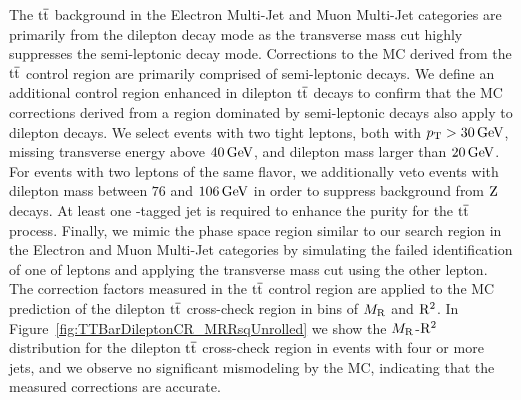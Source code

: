 The $\mathrm{t}\overline{\mathrm{t}}$ background in the Electron Multi-Jet and Muon Multi-Jet categories are primarily from
the dilepton decay mode as the transverse mass cut highly suppresses the semi-leptonic decay
mode. Corrections to the MC derived from the $\mathrm{t}\overline{\mathrm{t}}$ control region are primarily comprised
of semi-leptonic decays. We define an additional control region enhanced in dilepton $\mathrm{t}\overline{\mathrm{t}}$ decays 
to confirm that the MC corrections derived from a region dominated by
semi-leptonic decays also apply to dilepton decays. We select events with two tight leptons, 
both with $p_{\mathrm{T}}>30 \,\text{Ge\hspace{-.08em}V}$, missing transverse energy above $40\,\text{Ge\hspace{-.08em}V}$, and 
dilepton mass larger than $20\,\text{Ge\hspace{-.08em}V}$. For events with two leptons of the same flavor, we additionally
veto events with dilepton mass between $76$ and $106\,\text{Ge\hspace{-.08em}V}$ in order to suppress background from $\mathrm{Z}$ 
decays. At least one \PQb-tagged jet is required to enhance the purity for the $\mathrm{t}\overline{\mathrm{t}}$
process. Finally, we mimic the phase space region similar to our search region in the Electron and
Muon Multi-Jet categories by simulating the failed identification of one of leptons and applying
the transverse mass cut using the other lepton. The correction factors measured in the 
$\mathrm{t}\overline{\mathrm{t}}$ control region are applied to the MC prediction of the dilepton
$\mathrm{t}\overline{\mathrm{t}}$ cross-check region in bins of $M_\mathrm{R}$ and $\mathrm{R}^2$.
In Figure~\ref{fig:TTBarDileptonCR_MRRsqUnrolled}
we show the $M_\mathrm{R}$-$\mathrm{R}^2$ distribution for the dilepton $\mathrm{t}\overline{\mathrm{t}}$ cross-check region
in events with four or more jets, and we observe no significant mismodeling by the MC, 
indicating that the measured corrections are accurate.

